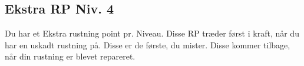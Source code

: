 \subsection*{Ekstra RP Niv. 4}
Du har et Ekstra rustning point pr. Niveau. Disse RP træder først i kraft, når du har en uskadt rustning på. Disse er de første, du mister. Disse kommer tilbage, når din rustning er blevet repareret.\\
